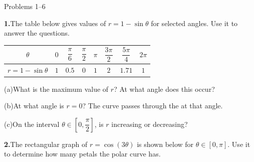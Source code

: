 \documentclass[10pt]{article}
\begin{document}
\namedateperiod

\vspace{0.10in}

\begin{notesbox}{Problems 1--6}

\textbf{1.}\quad The table below gives values of $r = 1 - \sin\theta$ for selected
angles. Use it to answer the questions.

\vspace{4pt}
\renewcommand{\arraystretch}{1.55}
\begin{tabular}{|c|c|c|c|c|c|c|c|}
\hline
$\theta$ & $0$ & $\dfrac{\pi}{6}$ & $\dfrac{\pi}{2}$ & $\pi$ &
           $\dfrac{3\pi}{2}$ & $\dfrac{5\pi}{4}$ & $2\pi$ \\
\hline
$r = 1 - \sin\theta$ & $1$ & $0.5$ & $0$ & $1$ & $2$ & $1.71$ & $1$ \\
\hline
\end{tabular}

\vspace{6pt}
(a)\quad What is the maximum value of $r$? \underline{\hspace{1.5cm}}
At what angle does this occur? \underline{\hspace{2cm}}

\vspace{4pt}
(b)\quad At what angle is $r = 0$? \underline{\hspace{2cm}}
The curve passes through the \underline{\hspace{2cm}} at that angle.

\vspace{4pt}
(c)\quad On the interval $\theta \in \left[0, \dfrac{\pi}{2}\right]$, is $r$
increasing or decreasing? \underline{\hspace{2.5cm}}

\vspace{0.14in}
\textbf{2.}\quad The rectangular graph of $r = \cos(3\theta)$ is shown below for
$\theta \in [0, \pi]$. Use it to determine how many petals the polar curve has.

\vspace{4pt}
\begin{center}
\end{center}


\end{notesbox}
\end{document}
